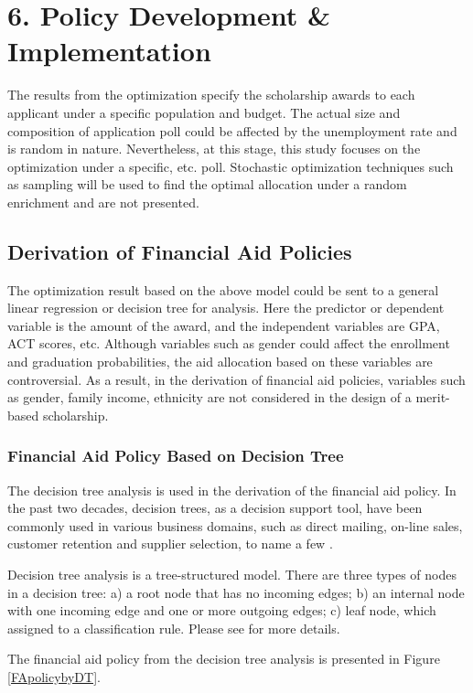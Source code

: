 \documentclass[12pt,english]{report}
\begin{document}
\chapter{6. Policy Development \& Implementation}
The results from the optimization specify the scholarship awards to each
applicant under
a specific population and budget.  The actual size and composition of
application poll 
could be affected by the unemployment rate and is random in nature. 
Nevertheless, at this
stage, this study focuses on the optimization under a specific, etc. poll. 
Stochastic
optimization techniques such as sampling will be used to find the optimal
allocation under
a random enrichment and are not presented. 



\section{Derivation of Financial Aid Policies}
The optimization result based on the above model could be sent to a general
linear regression
or decision tree for analysis.  Here the predictor or dependent variable is the
amount of 
the award, and the independent variables are GPA, ACT scores, etc.  Although
variables such
as gender could affect the enrollment and graduation probabilities, the aid
allocation based
on these variables are controversial. 
As a result, in the derivation of financial aid policies, variables such as
gender, family 
income, ethnicity are not considered in the design of a merit-based
scholarship.

 \subsection{Financial Aid Policy Based on Decision Tree }
The decision tree analysis is used in the derivation of the financial aid
policy.  In the 
past two decades, decision trees, as a decision support tool, have been
commonly used in 
various business domains, such as direct mailing, on-line sales, customer
retention and 
supplier selection, to name a few \citep{Han2011}.


Decision tree analysis is a tree-structured model. There are three types of
nodes in a 
decision tree: a) a root node that has no incoming edges; b) an internal node
with one 
incoming edge and one or more outgoing edges; c) leaf node, which assigned to a
classification
rule. Please see \citep{Maimon2005} for more details.

 The financial aid policy from the decision tree analysis is presented in
Figure
 \ref{FApolicybyDT}.
  
\end{document}
